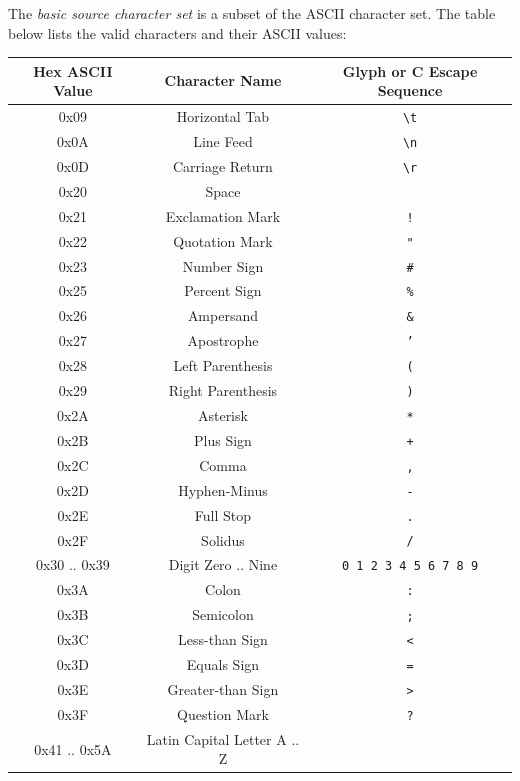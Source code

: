 
\p The \textit{basic source character set} is a subset of the ASCII character
set. The table below lists the valid characters and their ASCII values:

\begin{center}
  \begin{tabular}{|| c | c | c ||}
    \hline
    Hex ASCII Value & Character Name & Glyph or C Escape Sequence \\
    \hline
    0x09 & Horizontal Tab & \texttt{\textbackslash t} \\
    0x0A & Line Feed & \texttt{\textbackslash n} \\
    0x0D & Carriage Return & \texttt{\textbackslash r} \\
    0x20 & Space & \\
    0x21 & Exclamation Mark & \texttt{!}\\
    0x22 & Quotation Mark & \texttt{"}\\
    0x23 & Number Sign & \texttt{\#}\\
    0x25 & Percent Sign & \texttt{\%}\\
    0x26 & Ampersand & \texttt{\&}\\
    0x27 & Apostrophe & \texttt{'}\\
    0x28 & Left Parenthesis & \texttt{(}\\
    0x29 & Right Parenthesis & \texttt{)}\\
    0x2A & Asterisk & \texttt{*}\\
    0x2B & Plus Sign & \texttt{+}\\
    0x2C & Comma & \texttt{,}\\
    0x2D & Hyphen-Minus & \texttt{-}\\
    0x2E & Full Stop & \texttt{.}\\
    0x2F & Solidus & \texttt{/}\\
    0x30 .. 0x39 & Digit Zero .. Nine & \texttt{0 1 2 3 4 5 6 7 8 9}\\
    0x3A & Colon & \texttt{:}\\
    0x3B & Semicolon & \texttt{;}\\
    0x3C & Less-than Sign & \texttt{<}\\
    0x3D & Equals Sign & \texttt{=}\\
    0x3E & Greater-than Sign & \texttt{>}\\
    0x3F & Question Mark & \texttt{?}\\
    0x41 .. 0x5A & Latin Capital Letter A .. Z &

\end{tabular}
\end{center}
